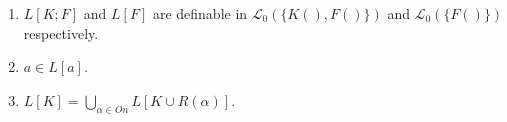 \begin{enumerate}
\item $L[K; F]$ and $L[F]$ are definable in $\mathcal{L}_0(\{K(), F()\})$ and $\mathcal{L}_0(\{F()\})$ respectively.
\item $a \in L[a]$.
\item $L[K] = \bigcup_{\alpha \in On} L[K \cup R(\alpha)]$.
\end{enumerate}
